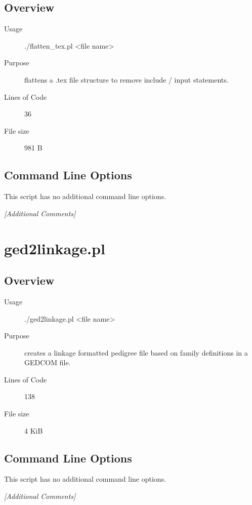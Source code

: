 \subsection{Overview}
\label{sec:flatten-tex.pl-overview}

\begin{description}
\item[Usage] ./flatten_tex.pl <file name>
\item[Purpose] flattens a .tex file structure to remove include / input statements.
\item[Lines of Code] 36
\item[File size] 981 B
\end{description}

\subsection{Command Line Options}
\label{sec:flatten-tex.pl-command-line}

This script has no additional command line options.

\emph{[Additional Comments]}

\section{ged2linkage.pl}
\label{sec:ged2linkage.pl}

\subsection{Overview}
\label{sec:ged2linkage.pl-overview}

\begin{description}
\item[Usage] ./ged2linkage.pl <file name>
\item[Purpose] creates a linkage formatted pedigree file based on family definitions in a GEDCOM file.
\item[Lines of Code] 138
\item[File size] 4 KiB
\end{description}

\subsection{Command Line Options}
\label{sec:ged2linkage.pl-command-line}

This script has no additional command line options.

\emph{[Additional Comments]}

